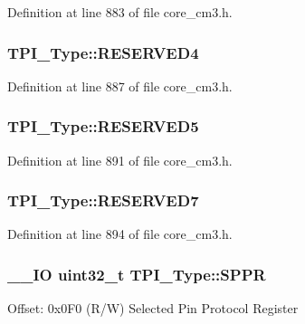 Definition at line 883 of file core\-\_\-cm3.\-h.

\hypertarget{struct_t_p_i___type_abc42f53d782de1b5e5b3e1b1637d6c96}{
\subsubsection[{R\-E\-S\-E\-R\-V\-E\-D4}]{ T\-P\-I\-\_\-\-Type\-::\-R\-E\-S\-E\-R\-V\-E\-D4}}\label{struct_t_p_i___type_abc42f53d782de1b5e5b3e1b1637d6c96}


Definition at line 887 of file core\-\_\-cm3.\-h.

\hypertarget{struct_t_p_i___type_ab7069d0594ca8b2c1952b6342a3b1f75}{
\subsubsection[{R\-E\-S\-E\-R\-V\-E\-D5}]{ T\-P\-I\-\_\-\-Type\-::\-R\-E\-S\-E\-R\-V\-E\-D5}}\label{struct_t_p_i___type_ab7069d0594ca8b2c1952b6342a3b1f75}


Definition at line 891 of file core\-\_\-cm3.\-h.

\hypertarget{struct_t_p_i___type_a58e6780b937267874964fb3efa9b96c7}{
\subsubsection[{R\-E\-S\-E\-R\-V\-E\-D7}]{ T\-P\-I\-\_\-\-Type\-::\-R\-E\-S\-E\-R\-V\-E\-D7}}\label{struct_t_p_i___type_a58e6780b937267874964fb3efa9b96c7}


Definition at line 894 of file core\-\_\-cm3.\-h.

\hypertarget{struct_t_p_i___type_a3eb655f2e45d7af358775025c1a50c8e}{
\subsubsection[{S\-P\-P\-R}]{\setlength{\rightskip}{0pt plus 5cm}\-\_\-\-\_\-\-I\-O {\bf uint32\-\_\-t} T\-P\-I\-\_\-\-Type\-::\-S\-P\-P\-R}}\label{struct_t_p_i___type_a3eb655f2e45d7af358775025c1a50c8e}
Offset\-: 0x0\-F0 (R/\-W) Selected Pin Protocol Register 

